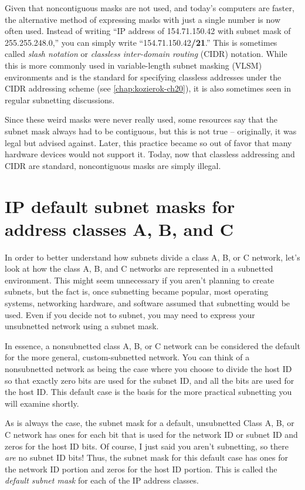 Given that noncontiguous masks are not used, and today's computers are
faster, the alternative method of expressing masks with just a single
number is now often used. Instead of writing
``IP address of 154.71.150.42 with subnet mask of 255.255.248.0,'' you can simply
write ``154.71.150.42\textbf{/21}.''
This is sometimes called \emph{slash notation} or \emph{classless inter-domain routing} (CIDR) notation.
While this is more commonly used in variable-length subnet masking (VLSM) environments and is the standard for specifying classless addresses under the CIDR addressing scheme (see \vref{chap:kozierok-ch20}), it is also sometimes seen in regular subnetting discussions.

\begin{note}
Since these weird masks were never really used, some resources
say that the subnet mask always had to be contiguous, but this is not true -- originally, it was legal but advised against.
Later, this practice became so out of favor that many hardware devices would not support it.
Today, now that classless addressing and CIDR are standard, noncontiguous masks are simply illegal.
\end{note}




\section{IP default subnet masks for address classes A, B, and C}

In order to better understand how subnets divide a class A, B, or C network, let's
look at how the class A, B, and C networks are represented in a
subnetted environment. This might seem unnecessary if you aren't
planning to create subnets, but the fact is, once subnetting became
popular, most operating systems, networking hardware, and software
assumed that subnetting would be used. Even if you decide not to subnet,
you may need to express your unsubnetted network using a subnet mask.

In essence, a nonsubnetted class A, B, or C network can be considered
the default for the more general, custom-subnetted network. You can
think of a nonsubnetted network as being the case where you choose to
divide the host ID so that exactly zero bits are used for the subnet ID,
and all the bits are used for the host ID. This default case is the
basis for the more practical subnetting you will examine shortly.

As is always the case, the subnet mask for a default, unsubnetted Class
A, B, or C network has ones for each bit that is used for the network ID
or subnet ID and zeros for the host ID bits. Of course, I just said you
aren't subnetting, so there {\emph{are}} no subnet ID bits! Thus, the
subnet mask for this default case has ones for the network ID portion
and zeros for the host ID portion. This is called the \emph{default subnet mask} for each of the IP address classes.

